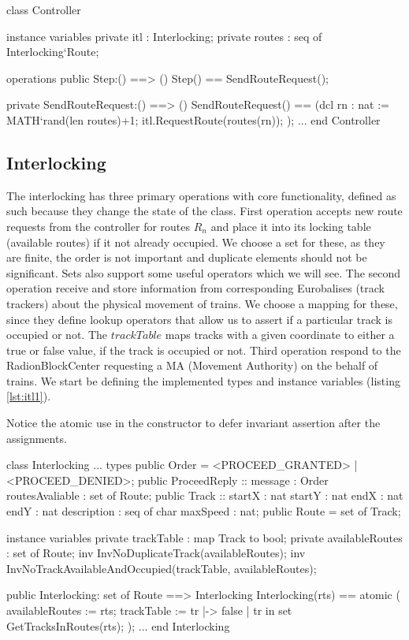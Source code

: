 \documentclass[preprint,12pt]{elsarticle}
\begin{document}
\begin{vdmsl}[label=lst:controller,caption=Definitions and SendRouteReques() operation in the Controller.]
	class Controller
	
	instance variables
	private itl : Interlocking;
	private routes : seq of Interlocking`Route;
	
	operations
	public Step:() ==> ()
	Step() == SendRouteRequest();
	
	private SendRouteRequest:() ==> ()
	SendRouteRequest() ==
	(dcl rn : nat := MATH`rand(len routes)+1;
		itl.RequestRoute(routes(rn));
	);
	...
	end Controller
\end{vdmsl}

\subsection{Interlocking}

The interlocking has three primary operations with core functionality, defined as such because they change the state of the class. First operation accepts new route requests from the controller for routes $R_{n}$ and place it into its locking table (available routes) if it not already occupied. We choose a set for these, as they are finite, the order is not important and duplicate elements should not be significant. Sets also support some useful operators which we will see. The second operation receive and store information from corresponding Eurobalises (track trackers) about the physical movement of trains. We choose a mapping for these, since they define lookup operators that allow us to assert if a particular track is occupied or not. The $trackTable$ maps tracks with a given coordinate to either a true or false value, if the track is occupied or not. Third operation respond to the RadionBlockCenter requesting a MA (Movement Authority) on the behalf of trains. We start be defining the implemented types and instance variables (listing \ref{lst:itl1}).

Notice the atomic use in the constructor to defer invariant assertion after the assignments.

\begin{vdmsl}[label=lst:itl1,caption=Types and state information and constructor for the Interlocking class.]
	class Interlocking
	...
	types
	public Order = <PROCEED_GRANTED> | <PROCEED_DENIED>;
	public ProceedReply :: message : Order
	routesAvaliable : set of Route;						 
	public Track :: startX : nat
	startY : nat
	endX : nat
	endY : nat
	description : seq of char
	maxSpeed : nat;
	public Route = set of Track;
	
	instance variables
	private trackTable : map Track to bool;
	private availableRoutes : set of Route;
	inv InvNoDuplicateTrack(availableRoutes);
	inv InvNoTrackAvailableAndOccupied(trackTable,
	 availableRoutes);
	
	public Interlocking: set of Route ==> Interlocking
	Interlocking(rts) ==
	atomic (
		availableRoutes := rts;
		trackTable := { tr |-> false |
			 tr in set GetTracksInRoutes(rts)};
	);
	...
	end Interlocking
\end{vdmsl}
\end{document}
